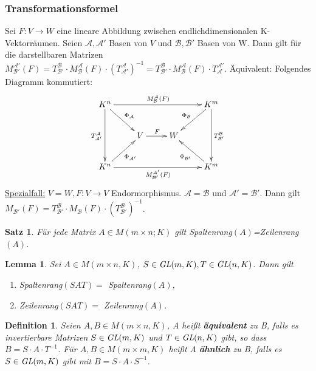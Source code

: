 \documentclass[12pt,a4paper]{article}
\theoremstyle{plain}
\newtheorem{Satz}[Theorem]{Satz}
\newtheorem{Lemma}[Theorem]{Lemma}
\newtheorem{Definition}[Theorem]{Definition}
\newcommand{\herv}[1]{{\emph{\textbf{#1}}}}
\numberwithin{equation}{section}
\begin{document}
\subsubsection{Transformationsformel}
Sei $F:V\rightarrow W$ eine lineare Abbildung zwischen endlichdimensionalen K-Vektorräumen. Seien $\mathcal{A},\mathcal{A'}$ Basen von $V$ und $\mathcal{B}, \mathcal{B'}$ Basen von W. Dann gilt für die darstellbaren Matrizen $M^\mathcal{A'}_\mathcal{B'}(F)=T^\mathcal{B}_\mathcal{B'}\cdot M^\mathcal{A}_\mathcal{B}(F)\cdot \left(T^\mathcal{A}_\mathcal{A'}\right)^{-1}=T^\mathcal{B}_\mathcal{B'}\cdot M^\mathcal{A}_\mathcal{B}(F)\cdot T^\mathcal{A'}_\mathcal{A}$. Äquivalent: Folgendes Diagramm kommutiert:
\[ \begin{xy}
	\xymatrix{
		K^n \ar[rrr]^{M^\mathcal{A}_\mathcal{B}(F)} \ar[dr]^{\Phi_\mathcal{A}} \ar[dd]_{T^\mathcal{A}_\mathcal{A'}} & & & K^m \ar[dl]_{\Phi_\mathcal{B}} \ar[dd]^{T^\mathcal{B}_\mathcal{B'}} \\
		&  V \ar[r]^F & W & \\
		K^n \ar[ur]_{\Phi_\mathcal{A'}} \ar[rrr]_{M^\mathcal{A'}_\mathcal{B'}(F)} & & & K^m \ar[ul]^{\Phi_\mathcal{B'}}
	}
\end{xy} \]
\underline{Spezialfall:} $V=W, F: V\rightarrow V$ Endormorphismus. $\mathcal{A}=\mathcal{B}$ und $\mathcal{A'}=\mathcal{B'}$. Dann gilt $M_\mathcal{B'}(F)=T^\mathcal{B}_\mathcal{B'}\cdot M_\mathcal{B}(F)\cdot\left( T^\mathcal{B}_\mathcal{B'}\right)^{-1}$.
\begin{Satz}
Für jede Matrix $A\in M(m\times n;K)$ gilt Spaltenrang$(A)$=Zeilenrang$(A)$.
\end{Satz}
\begin{Lemma}
Sei $A\in M(m\times n,K)$, $S\in\emph{GL}(m,K), T\in\emph{GL}(n,K)$. Dann gilt \begin{enumerate}
\renewcommand{\labelenumi}{\emph{\alph{enumi})}}
\item Spaltenrang$(SAT)=$ Spaltenrang$(A)$,
\item Zeilenrang$(SAT)=$ Zeilenrang$(A)$.
\end{enumerate}
\end{Lemma}
\begin{Definition}
Seien $A,B\in M(m\times n, K)$, A heißt \herv{äquivalent} zu B, falls es invertierbare Matrizen $S\in \emph{GL}(m,K)$ und $T\in \emph{GL}(n,K)$ gibt, so dass $B=S\cdot A\cdot T^{-1}$. Für $A,B\in M(m\times m,K)$ heißt A \herv{ähnlich} zu B, falls es $S\in \emph{GL}(m,K)$ gibt mit $B=S\cdot A\cdot S^{-1}$.
\end{Definition}
\end{document}
